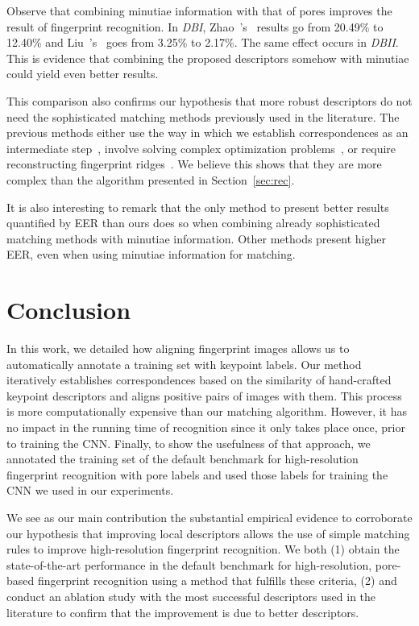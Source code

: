 \documentclass[10pt,twocolumn,letterpaper]{article}
\begin{document}
Observe that combining minutiae information with that of pores improves the result of fingerprint recognition.
In \textit{DBI}, Zhao~\etal's~\cite{direct-pore} results go from 20.49\% to 12.40\% and Liu~\etal's~\cite{feature-guided} goes from 3.25\% to 2.17\%.
The same effect occurs in \textit{DBII}.
This is evidence that combining the proposed descriptors somehow with minutiae could yield even better results.

This comparison also confirms our hypothesis that more robust descriptors do not need the sophisticated matching methods previously used in the literature.
The previous methods either use the way in which we establish correspondences as an intermediate step~\cite{direct-pore, td-sparse, feature-guided}, involve solving complex optimization problems~\cite{td-sparse, feature-guided, su-pores-deep}, or require reconstructing fingerprint ridges~\cite{ridge-reconstruction}.
We believe this shows that they are more complex than the algorithm presented in Section~\ref{sec:rec}.

It is also interesting to remark that the only method to present better results quantified by EER than ours does so when combining already sophisticated matching methods with minutiae information.
Other methods present higher EER, even when using minutiae information for matching.

\section{Conclusion}

In this work, we detailed how aligning fingerprint images allows us to automatically annotate a training set with keypoint labels.
Our method iteratively establishes correspondences based on the similarity of hand-crafted keypoint descriptors and aligns positive pairs of images with them.
This process is more computationally expensive than our matching algorithm.
However, it has no impact in the running time of recognition since it only takes place once, prior to training the CNN.
Finally, to show the usefulness of that approach, we annotated the training set of the default benchmark for high-resolution fingerprint recognition with pore labels and used those labels for training the CNN we used in our experiments.

We see as our main contribution the substantial empirical evidence to corroborate our hypothesis that improving local descriptors allows the use of simple matching rules to improve high-resolution fingerprint recognition.
We both (1) obtain the state-of-the-art performance in the default benchmark for high-resolution, pore-based fingerprint recognition using a method that fulfills these criteria, (2) and conduct an ablation study with the most successful descriptors used in the literature to confirm that the improvement is due to better descriptors.
\end{document}
